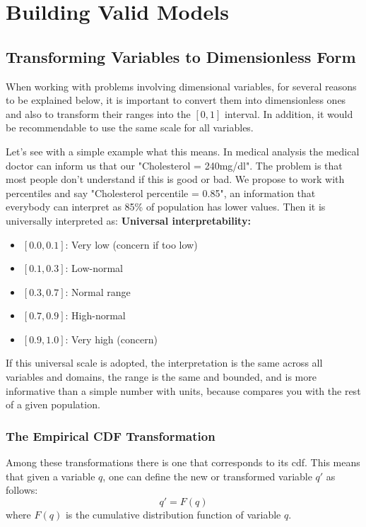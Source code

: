 \documentclass[
	11pt, %
	fleqn, %
	a4paper, %
]{LegrandOrangeBook}
\begin{document}
\part{Building Valid Models}
\chapter{Transforming Variables to Dimensionless Form}
\label{ch:cdftransformation}

When working with problems involving dimensional variables, for several reasons to be explained below, it is important to convert them into dimensionless ones and also to transform their ranges into the $[0,1]$ interval. In addition, it would be recommendable to use the same scale for all variables.

Let's see with a simple example what this means. In medical analysis the medical doctor can inform us that our "Cholesterol = 240mg/dl". The problem is that most people don't understand if this is good or bad. We propose to work with percentiles and say "Cholesterol percentile = 0.85", an information that everybody can interpret as 85\% of population has lower values. Then it is universally interpreted as:
\vspace{0.3cm}
\textbf{Universal interpretability:}
\begin{itemize}
\item $[0.0, 0.1]$: Very low (concern if too low)
\item $[0.1, 0.3]$: Low-normal
\item $[0.3, 0.7]$: Normal range
\item $[0.7, 0.9]$: High-normal
\item $[0.9, 1.0]$: Very high (concern)
\end{itemize}

If this universal scale is adopted, the interpretation is the same across all variables and domains, the range is the same and bounded, and is more informative than a simple number with units, because compares you with the rest of a given population.

\section{The Empirical CDF Transformation}
Among these transformations there is one that corresponds to its cdf. This means that given a variable $q$, one can define the new or transformed variable $q'$ as follows:
\begin{equation}
q' = F(q)
\label{eq:cdftransform}
\end{equation}
where $F(q)$ is the cumulative distribution function of variable $q$.
\end{document}
